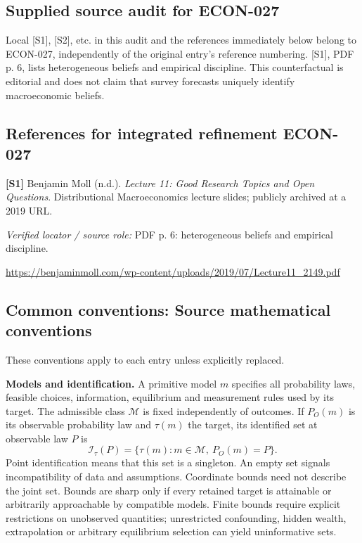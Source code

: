 \documentclass[11pt,a4paper]{article}
\begin{document}
\subsection*{Supplied source audit for ECON-027}
Local [S1], [S2], etc. in this audit and the references immediately below
belong to ECON-027, independently of the original entry's reference numbering.
[S1], PDF p. 6, lists heterogeneous beliefs and empirical discipline. This counterfactual is editorial and does not claim that survey forecasts uniquely identify macroeconomic beliefs.
\subsection*{References for integrated refinement ECON-027}
{\footnotesize\raggedright
\par\noindent\textbf{[S1]} Benjamin Moll (n.d.). \emph{Lecture 11: Good Research Topics and Open Questions}. Distributional Macroeconomics lecture slides; publicly archived at a 2019 URL.\par \textit{Verified locator / source role:} PDF p. 6: heterogeneous beliefs and empirical discipline.\par \url{https://benjaminmoll.com/wp-content/uploads/2019/07/Lecture11_2149.pdf}\par\smallskip
}

\subsection*{Common conventions: Source mathematical conventions}

These conventions apply to each entry unless explicitly replaced.

\textbf{Models and identification.} A primitive model \(m\) specifies all probability laws, feasible choices, information, equilibrium and measurement rules used by its target. The admissible class \(\mathcal M\) is fixed independently of outcomes. If \(P_O(m)\) is its observable probability law and \(\tau(m)\) the target, its identified set at observable law \(P\) is
\[
 \mathcal I_\tau(P)=\{\tau(m):m\in\mathcal M,\ P_O(m)=P\}.
\]
Point identification means that this set is a singleton. An empty set signals incompatibility of data and assumptions. Coordinate bounds need not describe the joint set. Bounds are sharp only if every retained target is attainable or arbitrarily approachable by compatible models. Finite bounds require explicit restrictions on unobserved quantities; unrestricted confounding, hidden wealth, extrapolation or arbitrary equilibrium selection can yield uninformative sets.
\end{document}

